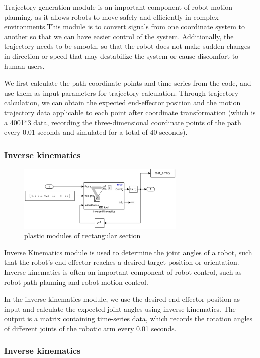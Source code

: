 Trajectory generation module is an important component of robot motion planning, as it allows robots to move safely and efficiently in complex environments.This module is to convert signals from one coordinate system to another so that we can have easier control of the system. Additionally, the trajectory needs to be smooth, so that the robot does not make sudden changes in direction or speed that may destabilize the system or cause discomfort to human users.

We first calculate the path coordinate points and time series from the code, and use them as input parameters for trajectory calculation. Through trajectory calculation, we can obtain the expected end-effector position and the motion trajectory data applicable to each point after coordinate transformation (which is a 4001*3 data, recording the three-dimensional coordinate points of the path every 0.01 seconds and simulated for a total of 40 seconds).


\subsubsection*{Inverse kinematics}

\begin{figure}[htbp]
    \centering
    \includegraphics[width=8cm]{./fig/IK.png}
    \caption{plastic modules of rectangular section  }
    \label{f1}
\end{figure}

Inverse Kinematics module is used to determine the joint angles of a robot, such that the robot's end-effector reaches a desired target position or orientation. Inverse kinematics is often an important component of robot control, such as robot path planning and robot motion control.

In the inverse kinematics module, we use the desired end-effector position as input and calculate the expected joint angles using inverse kinematics. The output is a matrix containing time-series data, which records the rotation angles of different joints of the robotic arm every 0.01 seconds.

\subsubsection*{Inverse kinematics}

